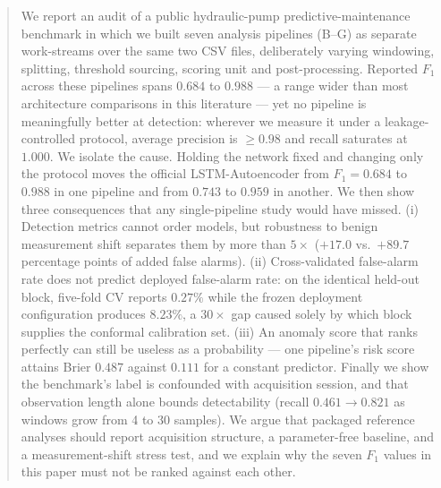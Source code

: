 \documentclass{article}
\begin{document}


\begin{abstract}
We report an audit of a public hydraulic-pump predictive-maintenance benchmark
in which we built seven analysis pipelines (B--G) as separate work-streams over
the same two CSV files, deliberately varying windowing, splitting, threshold
sourcing, scoring unit and post-processing. Reported $F_1$ across these
pipelines spans $0.684$ to $0.988$ --- a range wider than most architecture
comparisons in this literature --- yet no pipeline is meaningfully better at
detection: wherever we measure it under a leakage-controlled protocol, average
precision is $\ge 0.98$ and recall saturates at $1.000$. We isolate the cause.
Holding the network fixed and changing only the protocol moves the official
LSTM-Autoencoder from $F_1 = 0.684$ to $0.988$ in one pipeline and from
$0.743$ to $0.959$ in another. We then show three consequences that any
single-pipeline study would have missed. (i) Detection metrics cannot order
models, but robustness to benign measurement shift separates them by more than
$5\times$ ($+17.0$ vs.\ $+89.7$ percentage points of added false alarms).
(ii) Cross-validated false-alarm rate does not predict deployed false-alarm
rate: on the identical held-out block, five-fold CV reports $0.27\%$ while the
frozen deployment configuration produces $8.23\%$, a $30\times$ gap caused
solely by which block supplies the conformal calibration set. (iii) An anomaly
score that ranks perfectly can still be useless as a probability --- one
pipeline's risk score attains Brier $0.487$ against $0.111$ for a constant
predictor. Finally we show the benchmark's label is confounded with
acquisition session, and that observation length alone bounds detectability
(recall $0.461 \rightarrow 0.821$ as windows grow from 4 to 30 samples). We
argue that packaged reference analyses should report acquisition structure, a
parameter-free baseline, and a measurement-shift stress test, and we explain
why the seven $F_1$ values in this paper must not be ranked against each other.
\end{abstract}
\end{document}

